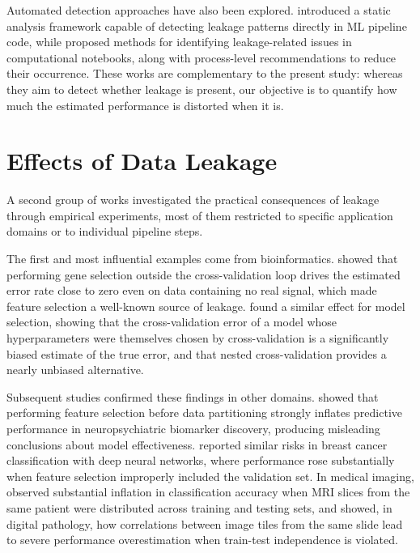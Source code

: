 Automated detection approaches have also been explored.
 introduced a static analysis framework capable of
detecting leakage patterns directly in ML pipeline code, while
 proposed methods for identifying leakage-related issues in
computational notebooks, along with process-level recommendations to reduce their
occurrence. These works are complementary to the present study: whereas they aim
to detect whether leakage is present, our objective is to quantify how much the
estimated performance is distorted when it is.

\section{Effects of Data Leakage}
\label{sec:tr-efeitos}

A second group of works investigated the practical consequences of leakage
through empirical experiments, most of them restricted to specific application
domains or to individual pipeline steps.

The first and most influential examples come from bioinformatics.
 showed that performing gene selection outside the
cross-validation loop drives the estimated error rate close to zero even on data
containing no real signal, which made feature selection a well-known source of
leakage.  found a similar effect for model selection,
showing that the cross-validation error of a model whose
hyperparameters were themselves chosen by cross-validation is a significantly
biased estimate of the true error, and that nested cross-validation provides a
nearly unbiased alternative.

Subsequent studies confirmed these findings in other domains.
 showed that performing feature selection before data
partitioning strongly inflates predictive performance in neuropsychiatric
biomarker discovery, producing misleading conclusions about model effectiveness.
 reported similar risks in breast cancer classification
with deep neural networks, where performance rose substantially when feature
selection improperly included the validation set. In medical imaging,
 observed substantial inflation in classification accuracy
when MRI slices from the same patient were distributed across training and
testing sets, and  showed, in digital pathology, how
correlations between image tiles from the same slide lead to severe performance
overestimation when train-test independence is violated.

